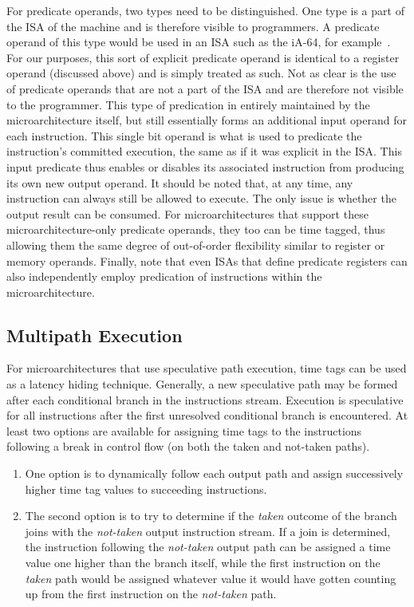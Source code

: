 \documentclass[10pt,twocolumn]{article}
\begin{document}
For predicate operands, two types need to be distinguished.
One type is a part of the ISA of the machine and
is therefore visible to programmers.
A predicate operand of this type would be
used in an ISA such as the iA-64, for example~\cite{iA64}.
For our purposes, this sort of explicit predicate operand
is identical to a register operand (discussed above) and
is simply treated as such.
Not as clear is the use of predicate operands
that are not a part of the ISA and are therefore not visible
to the programmer.
This type of predication in entirely maintained by the microarchitecture
itself, but still essentially forms an additional input operand
for each instruction.
This single bit operand is what is used to
predicate the instruction's committed execution, the same as
if it was explicit in the ISA.
This input predicate thus enables or disables its associated
instruction from producing its own new output operand.
It should be noted that, at any time, any instruction can
always still be allowed to execute.  The only issue is
whether the output result can be consumed.
For microarchitectures that support these microarchitecture-only
predicate operands, they too can be time tagged, thus allowing
them the same degree of out-of-order flexibility similar
to register or memory operands.
Finally, note that even ISAs that define predicate registers
can also independently employ predication of instructions within the
microarchitecture.
%
%
\vspace{-0.25in}
\subsection{Multipath Execution}
\vspace{-0.15in}
%
For microarchitectures that use speculative path
execution, time tags can be used 
as a latency hiding technique.
Generally, a new speculative path may be formed
after each conditional branch
in the instructions stream.  Execution is
speculative for all instructions after
the first unresolved conditional branch is encountered.
At least two options are available for assigning time tags
to the instructions following a break in control flow
(on both the taken and not-taken paths). 
%
\begin{enumerate}
\item One option is to dynamically follow
each output path and assign successively higher time tag values
to succeeding instructions.
\vspace{-0.15in}
\item The second option is to try to determine if the \textit{taken} outcome
of the branch joins with the \textit{not-taken} output instruction
stream.  If a join is determined, the instruction following
the \textit{not-taken} output path can be assigned a time value
one higher than the branch itself, while the first instruction
on the \textit{taken} path would be assigned whatever value
it would have gotten counting up from the first instruction
on the \textit{not-taken} path.
\end{enumerate}
\end{document}
